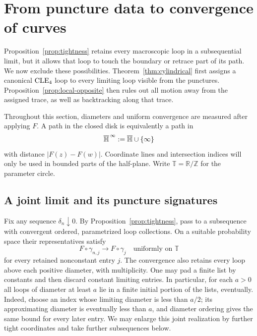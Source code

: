 \section{From puncture data to convergence of curves}
\label{sec:identification}

Proposition~\ref{prop:tightness} retains every macroscopic loop in a subsequential limit, but it allows that loop to touch the boundary or retrace part of its path. We now exclude these possibilities. Theorem~\ref{thm:cylindrical} first assigns a canonical $\mathrm{CLE}_4$ loop to every limiting loop visible from the punctures. Proposition~\ref{prop:local-opposite} then rules out all motion away from the assigned trace, as well as backtracking along that trace.

Throughout this section, diameters and uniform convergence are measured after applying $F$. A path in the closed disk is equivalently a path in
\[
 \overline{\mathbb H}^{\,\infty}:=\overline{\mathbb H}\cup\{\infty\}
\]
with distance $|F(z)-F(w)|$. Coordinate lines and intersection indices will only be used in bounded parts of the half-plane. Write $\mathbb T=\mathbb R/\mathbb Z$ for the parameter circle.

\subsection{A joint limit and its puncture signatures}

Fix any sequence $\delta_n\downarrow0$. By Proposition~\ref{prop:tightness}, pass to a subsequence with convergent ordered, parametrized loop collections. On a suitable probability space their representatives satisfy
\begin{equation}\label{eq:representative-convergence}
 F\circ\gamma_{n,j}\longrightarrow F\circ\gamma_j
 \quad\text{uniformly on }\mathbb T
\end{equation}
for every retained nonconstant entry $j$. The convergence also retains every loop above each positive diameter, with multiplicity. One may pad a finite list by constants and then discard constant limiting entries. In particular, for each $a>0$ all loops of diameter at least $a$ lie in a finite initial portion of the lists, eventually. Indeed, choose an index whose limiting diameter is less than $a/2$; its approximating diameter is eventually less than $a$, and diameter ordering gives the same bound for every later entry. We may enlarge this joint realization by further tight coordinates and take further subsequences below.

